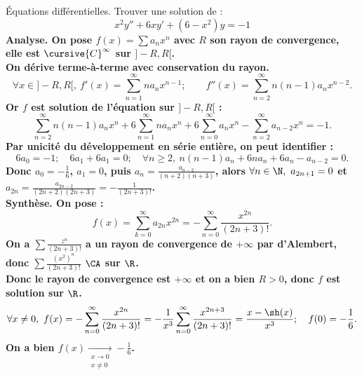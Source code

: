 \documentclass[11pt]{article}
\begin{document}
\vspace*{-0.8cm}

\begin{ex}{Équations différentielles.}{}
    Trouver une solution de :
    \begin{equation*}
        x^2y'' + 6xy' + (6-x^2)y = -1
    \end{equation*}
    \tcblower
    \bf{Analyse.} On pose $f(x)=\sum a_nx^n$ avec $R$ son rayon de convergence, elle est $\cursive{C}^\infty$ sur $]-R,R[$.\\
    On dérive terme-à-terme avec conservation du rayon.
    \begin{equation*}
        \forall x \in ]-R,R[, ~ f'(x)=\sum_{n=1}^\infty na_nx^{n-1}; \qquad f''(x)=\sum_{n=2}^\infty n(n-1)a_nx^{n-2}.
    \end{equation*}
    Or $f$ est solution de l'équation sur $]-R,R[$ :
    \begin{equation*}
        \sum_{n=2}^\infty n(n-1)a_n x^n  + 6\sum_{n=1}^\infty na_n x^n + 6\sum_{n=0}^\infty a_nx^n - \sum_{n=2}^{\infty}a_{n-2}x^{n} = -1.
    \end{equation*}
    Par unicité du développement en série entière, on peut identifier :
    \begin{equation*}
        6a_0 = -1; \quad 6a_1 + 6a_1 = 0; \quad \forall n \geq 2, ~ n(n-1)a_n + 6na_n + 6a_n - a_{n-2} = 0.
    \end{equation*}
    Donc $a_0=-\frac{1}{6}$, $a_1=0$, puis $a_n=\frac{a_{n-2}}{(n+2)(n+3)}$, alors $\forall n \in \N, ~ a_{2n+1}=0$ et $a_{2n}=\frac{a_{2n-2}}{(2n+2)(2n+3)}=-\frac{1}{(2n+3)!}$.\\
    \bf{Synthèse.} On pose :
    \begin{equation*}
        f(x) = \sum_{k=0}^\infty a_{2n}x^{2n} = -\sum_{n=0}^\infty \frac{x^{2n}}{(2n+3)!}.
    \end{equation*}
    On a $\sum \frac{z^n}{(2n+3)!}$ a un rayon de convergence de $+\infty$ par d'Alembert, donc $\sum\frac{(x^2)^n}{(2n+3)!}$ $\CA$ sur $\R$.\\
    Donc le rayon de convergence est $+\infty$ et on a bien $R>0$, donc $f$ est solution sur $\R$.
    \begin{equation*}
        \forall x \neq 0, ~ f(x) = -\sum_{n=0}^\infty\frac{x^{2n}}{(2n+3)!} = -\frac{1}{x^3}\sum_{n=0}^\infty\frac{x^{2n+3}}{(2n+3)!}=\frac{x-\sh(x)}{x^3}; \quad f(0)=-\frac{1}{6}.
    \end{equation*}
    On a bien $f(x)\xrightarrow[\substack{x\to0\\x\neq0}]{}-\frac{1}{6}$.
\end{ex}
\end{document}

